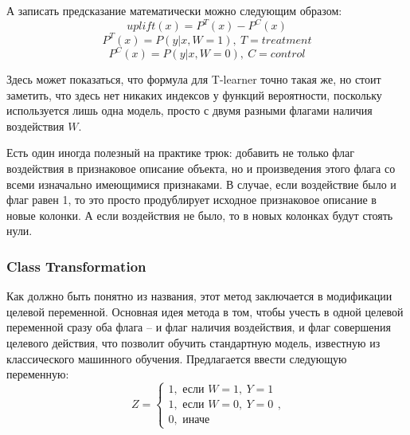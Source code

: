\iffalse 
Визуально модификацию выборки можно представить таким образом:

$$
\begin{matrix}
	\left(
	\begin{matrix}
    	  &  &   &  &  & \vline &   \\
    	  &  & X &  &  & \vline & y \\
    	  &  &   &  &  & \vline &   \\
	\end{matrix}
	\right)
\end{matrix}
\longrightarrow
\begin{matrix}
	\left(
	\begin{matrix}
    	  &  &   &  & \vline &   & \vline &   \\
    	  &  & X &  & \vline & W & \vline & y \\
    	  &  &   &  & \vline &   & \vline &   \\
	\end{matrix}
	\right)
\end{matrix}
$$

\fi

А записать предсказание математически можно следующим образом:
$$
    uplift(x) = P^T(x) - P^C(x)
$$
$$
    P^T(x) = P(y | x, W = 1), \: T = treatment
$$
$$
    P^C(x) = P(y | x, W = 0), \: C = control
$$

Здесь может показаться, что формула для T-learner точно такая же, но стоит заметить, что здесь нет никаких индексов у функций вероятности, поскольку используется лишь одна модель, просто с двумя разными флагами наличия воздействия $W$.

Есть один иногда полезный на практике трюк: добавить не только флаг воздействия в признаковое описание объекта, но и произведения этого флага со всеми изначально имеющимися признаками. В случае, если воздействие было и флаг равен 1, то это просто продублирует исходное признаковое описание в новые колонки. А если воздействия не было, то в новых колонках будут стоять нули.












\subsubsection*{Class Transformation}

Как должно быть понятно из названия, этот метод заключается в модификации целевой переменной. Основная идея метода в том, чтобы учесть в одной целевой переменной сразу оба флага -- и флаг наличия воздействия, и флаг совершения целевого действия, что позволит обучить стандартную модель, известную из классического машинного обучения. Предлагается ввести следующую переменную:
$$
    Z =
    \begin{cases}
        1, \text{ если } W = 1, \: Y = 1 \\
        1, \text{ если } W = 0, \: Y = 0 \\
        0, \text{ иначе }
    \end{cases},
$$

